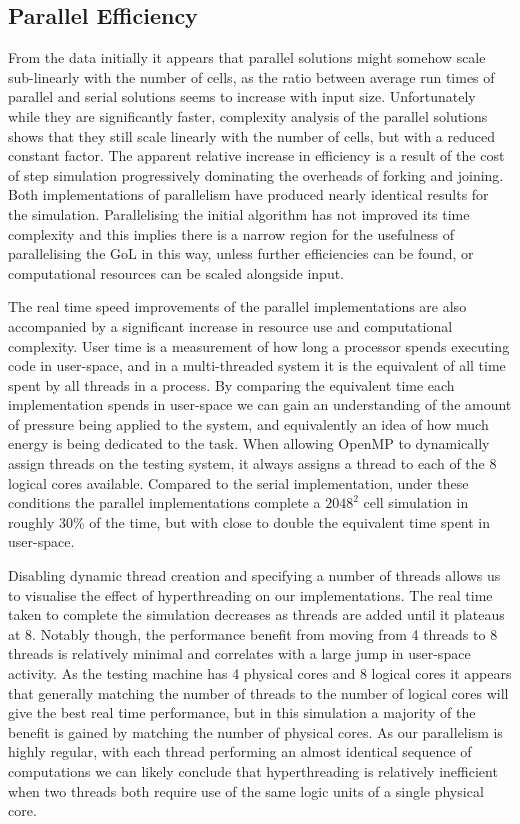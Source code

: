 \documentclass[]{article}
\begin{document}
\subsection{Parallel Efficiency}
From the data initially it appears that parallel solutions might somehow scale sub-linearly with the number of cells, as the ratio between average run times of parallel and serial solutions seems to increase with input size. Unfortunately while they are significantly faster, complexity analysis of the parallel solutions shows that they still scale linearly with the number of cells, but with a reduced constant factor. The apparent relative increase in efficiency is a result of the cost of step simulation progressively dominating the overheads of forking and joining. Both implementations of parallelism have produced nearly identical results for the simulation. Parallelising the initial algorithm has not improved its time complexity and this implies there is a narrow region for the usefulness of parallelising the GoL in this way, unless further efficiencies can be found, or computational resources can be scaled alongside input.

The real time speed improvements of the parallel implementations are also accompanied by a significant increase in resource use and computational complexity. User time is a measurement of how long a processor spends executing code in user-space, and in a multi-threaded system it is the equivalent of all time spent by all threads in a process. By comparing the equivalent time each implementation spends in user-space we can gain an understanding of the amount of pressure being applied to the system, and equivalently an idea of how much energy is being dedicated to the task. When allowing OpenMP to dynamically assign threads on the testing system, it always assigns a thread to each of the 8 logical cores available. Compared to the serial implementation, under these conditions the parallel implementations complete a $2048^2$ cell simulation in roughly 30\% of the time, but with close to double the equivalent time spent in user-space.

Disabling dynamic thread creation and specifying a number of threads allows us to visualise the effect of hyperthreading on our implementations. The real time taken to complete the simulation decreases as threads are added until it plateaus at 8. Notably though, the performance benefit from moving from 4 threads to 8 threads is relatively minimal and correlates with a large jump in user-space activity. As the testing machine has 4 physical cores and 8 logical cores it appears that generally matching the number of threads to the number of logical cores will give the best real time performance, but in this simulation a majority of the benefit is gained by matching the number of physical cores. As our parallelism is highly regular, with each thread performing an almost identical sequence of computations we can likely conclude that hyperthreading is relatively inefficient when two threads both require use of the same logic units of a single physical core.
\end{document}
